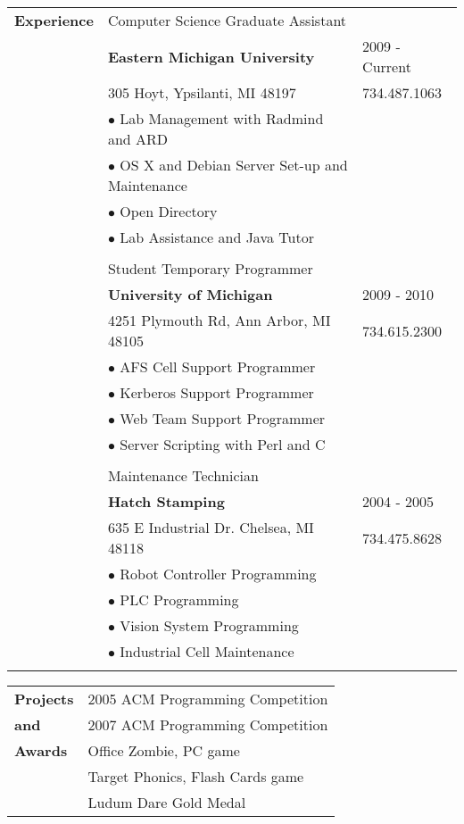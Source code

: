 \documentclass[12pt,a4paper]{article}
\begin{document}
\begin{tabular}{ p{} p{} l  }
\textbf{Experience} &

Computer Science Graduate Assistant & \ \\
\ & \textbf{Eastern Michigan University} & 2009 - Current \\
\ & 305 Hoyt, Ypsilanti, MI 48197 & 734.487.1063\\

\ & $\bullet$ Lab Management with Radmind and ARD & \ \\
\ & $\bullet$ OS X and Debian Server Set-up and Maintenance & \ \\
\ & $\bullet$ Open Directory & \ \\
\ & $\bullet$ Lab Assistance and Java Tutor & \ \\

\\
\ & Student Temporary Programmer & \ \\
\ &\textbf{University of Michigan} & 2009 - 2010 \\
\ & 4251 Plymouth Rd, Ann Arbor, MI 48105 & 734.615.2300 \\
\ & $\bullet$ AFS Cell Support Programmer & \ \\
\ & $\bullet$ Kerberos  Support Programmer & \ \\
\ & $\bullet$ Web Team Support Programmer & \ \\
\ & $\bullet$ Server Scripting with Perl and C & \ \\

\\
\ & Maintenance Technician & \ \\
\ &\textbf{Hatch Stamping} & 2004 - 2005 \\
\ & 635 E Industrial Dr. Chelsea, MI 48118 & 734.475.8628 \\

\ & $\bullet$ Robot Controller Programming & \ \\
\ & $\bullet$ PLC Programming & \ \\
\ & $\bullet$ Vision System Programming & \ \\
\ & $\bullet$ Industrial Cell Maintenance & \ \\
\\
\end{tabular}

\begin{tabular}{  p{} p{} }
\textbf{Projects} & 
2005 ACM Programming Competition \\
\textbf{and} & 2007 ACM Programming Competition \\
\textbf{Awards} & Office Zombie, PC game \\
\ & Target Phonics, Flash Cards game \\
\ & Ludum Dare Gold Medal \\

\end{tabular}
\end{document}
